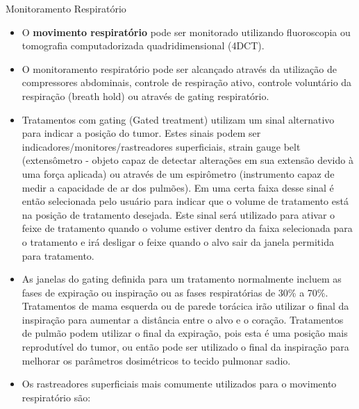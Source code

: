 \documentclass[11pt,a4paper]{article}
\newcounter{exemplo}
\begin{document}
\begin{exemplo}
\begin{itemize}
    \end{itemize}

    \textcolor{CarnationPink}{Monitoramento Respiratório}
    \begin{itemize}
        \item O \textbf{movimento respiratório} pode ser monitorado utilizando fluoroscopia ou tomografia computadorizada quadridimensional (4DCT).
        
        \item O monitoramento respiratório pode ser alcançado através da utilização de compressores abdominais, controle de respiração ativo, controle voluntário da respiração (breath hold) ou através de gating respiratório.
        
        \item Tratamentos com gating (Gated treatment) utilizam um sinal alternativo para indicar a posição do tumor. Estes sinais podem ser indicadores/monitores/rastreadores superficiais, strain gauge belt (extensômetro - objeto capaz de detectar alterações em sua extensão devido à uma força aplicada) ou através de um espirômetro (instrumento capaz de medir a capacidade de ar dos pulmões). Em uma certa faixa desse sinal é então selecionada pelo usuário para indicar que o volume de tratamento está na posição de tratamento desejada. Este sinal será utilizado para ativar o feixe de tratamento quando o volume estiver dentro da faixa selecionada para o tratamento e irá desligar o feixe quando o alvo sair da janela permitida para tratamento.
        
        \item As janelas do gating definida para um tratamento normalmente incluem as fases de expiração ou inspiração ou as fases respiratórias de 30\% a 70\%. Tratamentos de mama esquerda ou de parede torácica irão utilizar o final da inspiração para aumentar a distância entre o alvo e o coração. Tratamentos de pulmão podem utilizar o final da expiração, pois esta é uma posição mais reprodutível do tumor, ou então pode ser utilizado o final da inspiração para melhorar os parâmetros dosimétricos to tecido pulmonar sadio.
        
        \item Os rastreadores superficiais mais comumente utilizados para o movimento respiratório são:
        

\end{itemize}
\end{exemplo}
\end{document}
